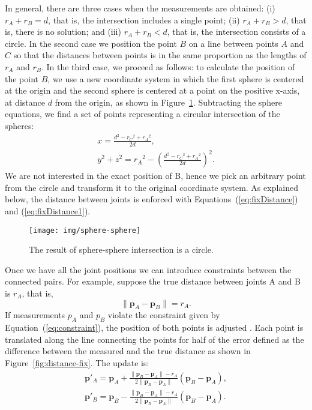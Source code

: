 In general, there are three cases when the measurements are obtained: (i) $r_A+r_B=d$, that is, the intersection includes a single point; (ii) $r_A+r_B>d$, that is, there is no solution; and (iii) $r_A+r_B<d$, that is, the intersection consists of a circle. In the second case we position the point $B$ on a line between points $A$ and $C$ so that the distances between points is in the same proportion as the lengths of $r_A$ and $r_B$.
%
In the third case, we proceed as follows: to calculate the position of the point $B$, we use a new coordinate system in which the first sphere is centered at the origin and the second sphere is centered at a point on the positive x-axis, at distance $d$ from the origin, as shown in Figure~\ref{fig:sphere-sphere}. Subtracting the sphere equations, we find a set of points representing a circular intersection of the spheres:
\begin{eqnarray}
\label{eq:circle}
x = \frac{d^2 - {r_C}^2 + {r_A}^2}{2d}, \\
\label{eq:circle1}
y^2 + z^2 = {r_A}^2 - (\frac{d^2 - {r_C}^2 + {r_A}^2}{2d})^2.
\end{eqnarray}
We are not interested in the exact position of B, hence we pick an arbitrary point from the circle and transform it to the original coordinate system.  As explained below, the distance between joints is enforced with Equations~(\ref{eq:fixDistance}) and (\ref{eq:fixDistance1}).

\begin{figure}[!h]
\centering
\texttt{[image: img/sphere-sphere]}
\caption{The result of sphere-sphere intersection is a circle.}
\label{fig:sphere-sphere}
\end{figure}

Once we have all the joint positions we can introduce constraints between the connected pairs. For example, suppose the true distance between joints A and  B is $r_A$, that is,
\begin{equation}
\label{eq:constraint}
\|\mathbf{p}_A - \mathbf{p}_B\| = r_A.
\end{equation}
If measurements $p_{A}$ and $p_B$ violate the constraint given by Equation~(\ref{eq:constraint}), the position of both points is adjusted \citep{Jakobsen2001}. 
Each point is translated along the line connecting the points for half of the error defined as the difference between the measured and the true distance as shown in Figure~\ref{fig:distance-fix}. The update is:
\begin{eqnarray}
\label{eq:fixDistance}
\mathbf{p}'_A = \mathbf{p}_A + \frac{\|\mathbf{p}_B-\mathbf{p}_A\| - r_A}{2\|\mathbf {p}_B-\mathbf{p}_A\|}(\mathbf{p}_B-\mathbf{p}_A),\\
\label{eq:fixDistance1}
\mathbf{p}'_B = \mathbf{p}_B - \frac{\|\mathbf {p}_B-\mathbf{p}_A\| - r_A}{2\|\mathbf{p}_B-\mathbf{p}_A\|}(\mathbf {p}_B-\mathbf{p}_A).
\end{eqnarray}

